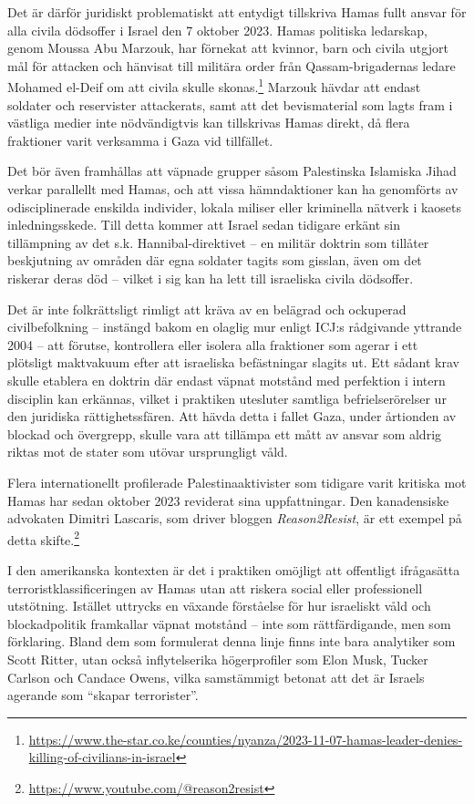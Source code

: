 Det är därför juridiskt problematiskt att entydigt tillskriva Hamas fullt ansvar för alla civila dödsoffer
i Israel den 7 oktober 2023. Hamas politiska ledarskap, genom Moussa Abu Marzouk, har förnekat att kvinnor,
barn och civila utgjort mål för attacken och hänvisat till militära order från Qassam-brigadernas ledare
Mohamed el-Deif om att civila skulle skonas.\footnote{\url{https://www.the-star.co.ke/counties/nyanza/2023-11-07-hamas-leader-denies-killing-of-civilians-in-israel}} Marzouk hävdar att endast soldater och
reservister attackerats, samt att det bevismaterial som lagts fram i västliga medier inte nödvändigtvis
kan tillskrivas Hamas direkt, då flera fraktioner varit verksamma i Gaza vid tillfället.

Det bör även framhållas att väpnade grupper såsom Palestinska Islamiska Jihad verkar parallellt med Hamas,
och att vissa hämndaktioner kan ha genomförts av odisciplinerade enskilda individer, lokala miliser eller kriminella
nätverk i kaosets inledningsskede. Till detta kommer att Israel sedan tidigare erkänt sin tillämpning av det
s.k. Hannibal-direktivet – en militär doktrin som tillåter beskjutning av områden där egna soldater tagits som
gisslan, även om det riskerar deras död – vilket i sig kan ha lett till israeliska civila dödsoffer.

Det är inte folkrättsligt rimligt att kräva av en belägrad och ockuperad civilbefolkning – instängd bakom en
olaglig mur enligt ICJ:s rådgivande yttrande 2004 – att förutse, kontrollera eller isolera alla fraktioner
som agerar i ett plötsligt maktvakuum efter att israeliska befästningar slagits ut. Ett sådant krav skulle
etablera en doktrin där endast väpnat motstånd med perfektion i intern disciplin kan erkännas, vilket i praktiken
utesluter samtliga befrielserörelser ur den juridiska rättighetssfären. Att hävda detta i fallet Gaza, under
årtionden av blockad och övergrepp, skulle vara att tillämpa ett mått av ansvar som aldrig riktas mot de stater
som utövar ursprungligt våld.


Flera internationellt profilerade Palestinaaktivister som tidigare varit kritiska mot Hamas har sedan
oktober 2023 reviderat sina uppfattningar. Den kanadensiske advokaten Dimitri Lascaris, som driver bloggen
\textit{Reason2Resist}, är ett exempel på detta skifte.\footnote{\url{https://www.youtube.com/@reason2resist}}


I den amerikanska kontexten är det i praktiken omöjligt att offentligt ifrågasätta terroristklassificeringen
av Hamas utan att riskera social eller professionell utstötning. Istället uttrycks en växande förståelse för
hur israeliskt våld och blockadpolitik framkallar väpnat motstånd – inte som rättfärdigande, men som förklaring.
Bland dem som formulerat denna linje finns inte bara analytiker som Scott Ritter, utan också inflytelserika
högerprofiler som Elon Musk, Tucker Carlson och Candace Owens, vilka samstämmigt betonat att det är Israels
agerande som “skapar terrorister”.

